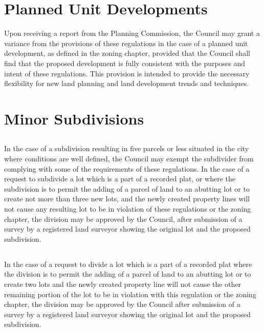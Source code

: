 \section{Planned Unit Developments}
Upon receiving a report from the Planning Commission, the Council may grant a variance from the provisions of these regulations in the case of a planned unit development, as defined in the zoning chapter, provided that the Council shall find that the proposed development is fully consistent with the purposes and intent of these regulations. This provision is intended to provide the necessary flexibility for new land planning and land development trends and techniques.

\section{Minor Subdivisions}
\subsection{}
In the case of a subdivision resulting in five parcels or less situated in the city where conditions are well defined, the Council may exempt the subdivider from complying with some of the requirements of these regulations. In the case of a request to subdivide a lot which is a part of a recorded plat, or where the subdivision is to permit the adding of a parcel of land to an abutting lot or to create not more than three new lots, and the newly created property lines will not cause any resulting lot to be in violation of these regulations or the zoning chapter, the division may be approved by the Council, after submission of a survey by a registered land surveyor showing the original lot and the proposed subdivision.
\subsection{}
In the case of a request to divide a lot which is a part of a recorded plat where the division is to permit the adding of a parcel of land to an abutting lot or to create two lots and the newly created property line will not cause the other remaining portion of the lot to be in violation with this regulation or the zoning chapter, the division may be approved by the Council after submission of a survey by a registered land surveyor showing the original lot and the proposed subdivision.

